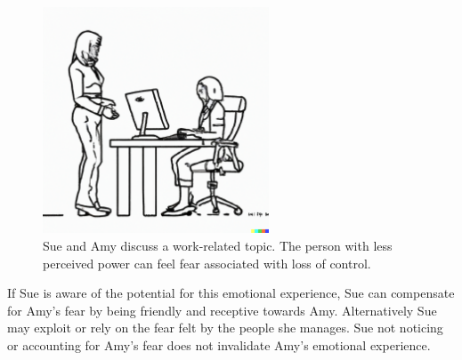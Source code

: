 \begin{figure}[H]
    \centering
\includegraphics[width=0.6\textwidth,trim={0 1cm 0 0},clip]{images/female_supervisor_standing_while_talking_to_seated_female_employee_typing_on_keyboard.pdf}
    \caption{Sue and Amy discuss a work-related topic. The person with less perceived power can feel fear associated with loss of control.}
    \label{fig:subordinate_and_supervisor}
\end{figure}



If Sue is aware of the potential for this emotional experience, Sue can compensate for Amy's fear by being friendly and receptive towards Amy. Alternatively Sue may exploit or rely on the fear felt by the people she manages. Sue not noticing or accounting for Amy's fear does not invalidate Amy's emotional experience.






